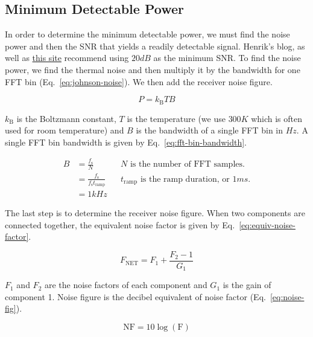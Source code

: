 \subsection{Minimum Detectable Power}
\label{sec:min-detectable-power}

In order to determine the minimum detectable power, we must find the noise power and then the SNR
that yields a readily detectable signal. Henrik's blog, as well as
\href{http://www.wireless-nets.com/resources/tutorials/define_SNR_values.html}{this site} recommend
using $20 \si{dB}$ as the minimum SNR\@. To find the noise power, we find the thermal noise and then
multiply it by the bandwidth for one FFT bin (Eq.~\ref{eq:johnson-noise}). We then add the receiver
noise figure.

\begin{equation}
        \label{eq:johnson-noise}
        P = k_{\text{B}} T B
\end{equation}

$k_{\text{B}}$ is the Boltzmann constant, $T$ is the temperature (we use $300 \si{K}$ which is often
used for room temperature) and $B$ is the bandwidth of a single FFT bin in $\si{Hz}$. A single FFT
bin bandwidth is given by Eq.~\ref{eq:fft-bin-bandwidth}.

\begin{align}
        \label{eq:fft-bin-bandwidth}
        B &= \frac{f_{\text{s}}}{N} && \text{$N$ is the number of FFT samples.} \\
        &= \frac{f_{\text{s}}}{f_{\text{s}} t_{\text{ramp}}} && \text{$t_{\text{ramp}}$ is the ramp
                                                                duration, or $1 \si{ms}$.} \\
        &= 1 \si{kHz}
\end{align}

The last step is to determine the receiver noise figure. When two components are connected together,
the equivalent noise factor is given by Eq.~\ref{eq:equiv-noise-factor}.

\begin{equation}
        \label{eq:equiv-noise-factor}
        F_{\text{NET}} = F_1 + \frac{F_2 - 1}{G_1}
\end{equation}

$F_1$ and $F_2$ are the noise factors of each component and $G_1$ is the gain of component 1. Noise
figure is the decibel equivalent of noise factor (Eq.~\ref{eq:noise-fig}).

\begin{equation}
        \label{eq:noise-fig}
        \text{NF} = 10 \log(\text{F})
\end{equation}

